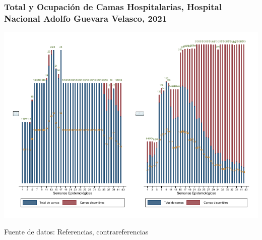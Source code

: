 \documentclass[xcolor=table]{beamer}
\begin{document}
	\begin{frame}
		\frametitle{Total y Ocupación de Camas Hospitalarias, Hospital Nacional Adolfo Guevara Velasco, 2021}
		\vspace{-.2cm}
		\begin{center}
			\includegraphics[width=0.9\linewidth, trim={0cm .5cm 0cm 0.2cm},clip]{../figuras/h_adolfo}
			
			\begin{table}[]
			\end{table}
			
		\end{center}
		{\tiny Fuente de datos: Referencias, contrareferencias}
	\end{frame}
	
\end{document}
